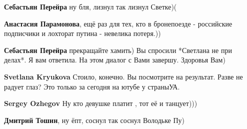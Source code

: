 \begin{itemize}
\begin{itemize}
 
\textbf{Себастьян Перейра} ну бля, лизнул так лизнул Светке)(

 
\textbf{Анастасия Парамонова}, ещё раз для тех, кто в бронепоезде - российские подписчики и лохторат путина - невелика потеря.))

 
\textbf{Себастьян Перейра} прекращайте хамить)
Вы спросили *Светлана не при делах*. Я вам ответила. На этом диалог с Вами завершу. Здоровья Вам)

 
\textbf{Svetlana Kryukova} Стоило, конечно. Вы посмотрите на результат. Разве не радует глаз? \Smiley[1.0][yellow] Это только за сегодня на ютубе у страныУА.

 
\textbf{Sergey Ozhegov} Ну кто девушке платит , тот её и танцует)))

 
\textbf{Дмитрий Тошин}, ну ёпт, соснул так соснул Володьке Пу)

 

\end{itemize}
\end{itemize}
